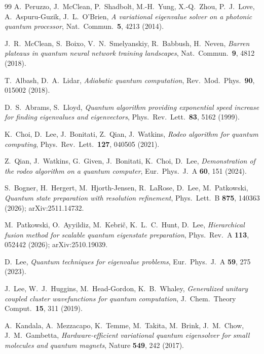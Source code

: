 \documentclass[
  aps,            %
  prc,            %
  reprint,        %
  superscriptaddress,
  floatfix,
  nofootinbib
]{revtex4-2}
\begin{document}
\begin{thebibliography}{99}
A.~Peruzzo, J.~McClean, P.~Shadbolt, M.-H.~Yung, X.-Q.~Zhou, P.~J.~Love,
A.~Aspuru-Guzik, J.~L.~O'Brien,
\textit{A variational eigenvalue solver on a photonic quantum processor},
Nat.\ Commun.\ \textbf{5}, 4213 (2014).

J.~R.~McClean, S.~Boixo, V.~N.~Smelyanskiy, R.~Babbush, H.~Neven,
\textit{Barren plateaus in quantum neural network training landscapes},
Nat.\ Commun.\ \textbf{9}, 4812 (2018).

T.~Albash, D.~A.~Lidar,
\textit{Adiabatic quantum computation},
Rev.\ Mod.\ Phys.\ \textbf{90}, 015002 (2018).

D.~S.~Abrams, S.~Lloyd,
\textit{Quantum algorithm providing exponential speed increase for finding
eigenvalues and eigenvectors},
Phys.\ Rev.\ Lett.\ \textbf{83}, 5162 (1999).

K.~Choi, D.~Lee, J.~Bonitati, Z.~Qian, J.~Watkins,
\textit{Rodeo algorithm for quantum computing},
Phys.\ Rev.\ Lett.\ \textbf{127}, 040505 (2021).

Z.~Qian, J.~Watkins, G.~Given, J.~Bonitati, K.~Choi, D.~Lee,
\textit{Demonstration of the rodeo algorithm on a quantum computer},
Eur.\ Phys.\ J.\ A \textbf{60}, 151 (2024).

S.~Bogner, H.~Hergert, M.~Hjorth-Jensen, R.~LaRose, D.~Lee, M.~Patkowski,
\textit{Quantum state preparation with resolution refinement},
Phys.\ Lett.\ B \textbf{875}, 140363 (2026); arXiv:2511.14732.

M.~Patkowski, O.~Ayyildiz, M.~Kebri\v{c}, K.~L.~C.~Hunt, D.~Lee,
\textit{Hierarchical fusion method for scalable quantum eigenstate preparation},
Phys.\ Rev.\ A \textbf{113}, 052442 (2026); arXiv:2510.19039.

D.~Lee,
\textit{Quantum techniques for eigenvalue problems},
Eur.\ Phys.\ J.\ A \textbf{59}, 275 (2023).

J.~Lee, W.~J.~Huggins, M.~Head-Gordon, K.~B.~Whaley,
\textit{Generalized unitary coupled cluster wavefunctions for quantum computation},
J.\ Chem.\ Theory Comput.\ \textbf{15}, 311 (2019).

A.~Kandala, A.~Mezzacapo, K.~Temme, M.~Takita, M.~Brink, J.~M.~Chow,
J.~M.~Gambetta,
\textit{Hardware-efficient variational quantum eigensolver for small molecules
and quantum magnets},
Nature \textbf{549}, 242 (2017).


\end{thebibliography}
\end{document}
